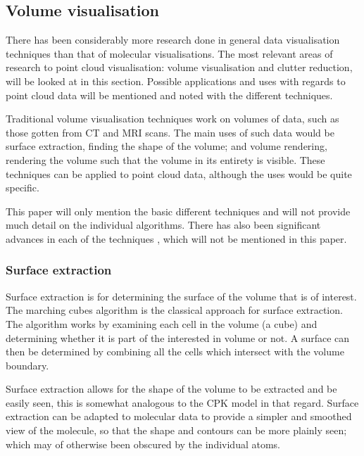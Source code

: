 

\subsection*{Volume visualisation}
\label{sub:volume_visualisation}

There has been considerably more research done in general data visualisation
techniques than that of molecular visualisations. The most relevant areas of
research to point cloud visualisation: volume visualisation and clutter
reduction, will be looked at in this section. Possible applications and uses
with regards to point cloud data will be mentioned and noted with the different
techniques.

Traditional volume visualisation techniques work on volumes of data, such as
those gotten from CT and MRI scans. The main uses of such data would be surface
extraction, finding the shape of the volume; and volume rendering, rendering the
volume such that the volume in its entirety is visible. These techniques can be
applied to point cloud data, although the uses would be quite specific.

This paper will only mention the basic different techniques and will not provide
much detail on the individual algorithms. There has also been significant
advances in each of the techniques \citep{brodlie01}, which will not be
mentioned in this paper.

\subsubsection*{Surface extraction}
\label{ssub:surface_extraction}

Surface extraction is for determining the surface of the volume that is of
interest. The marching cubes algorithm \citep{lorensen87} is the classical
approach for surface extraction. The algorithm works by examining each cell in
the volume (a cube) and determining whether it is part of the interested in
volume or not. A surface can then be determined by combining all the cells which
intersect with the volume boundary.

Surface extraction allows for the shape of the volume to be extracted and be
easily seen, this is somewhat analogous to the CPK model in that regard. Surface
extraction can be adapted to molecular data to provide a simpler and smoothed
view of the molecule, so that the shape and contours can be more plainly seen;
which may of otherwise been obscured by the individual atoms.

